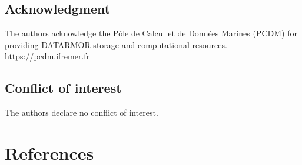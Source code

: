 \documentclass[9pt,biorxiv,doublespacing,lineno,endfloat]{lapreprint}
\begin{document}
\hypertarget{acknowledgment}{%
\subsection{Acknowledgment}\label{acknowledgment}}

The authors acknowledge the Pôle de Calcul et de Données Marines (PCDM)
for providing DATARMOR storage and computational resources.
\url{https://pcdm.ifremer.fr}

\hypertarget{conflict-of-interest}{%
\subsection{Conflict of interest}\label{conflict-of-interest}}

The authors declare no conflict of interest.

\hypertarget{references}{%
\section*{References}\label{references}}
\end{document}
